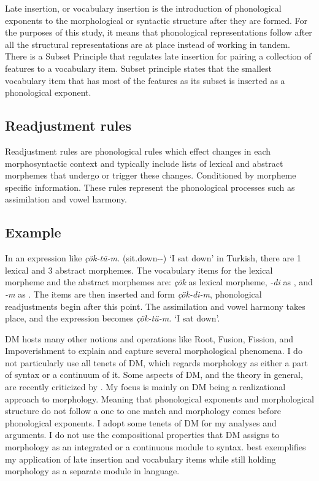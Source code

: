 Late insertion, or vocabulary insertion is the introduction of phonological exponents to the morphological or syntactic structure after they are formed. For the purposes of this study, it means that phonological representations follow after all the structural representations are at place instead of working in tandem. There is a Subset Principle \cite{halle2000distributed} that regulates late insertion for pairing a collection of features to a vocabulary item. Subset principle states that the smallest vocabulary item that has most of the features as its subset is inserted as a phonological exponent. 

\subsection{Readjustment rules}

Readjustment rules are phonological rules which effect changes in each morphosyntactic context and typically include lists of lexical and abstract morphemes that undergo or trigger these changes. Conditioned by morpheme specific information. These rules represent the phonological processes such as assimilation and vowel harmony.


\subsection{Example}

In an expression like \textit{çök-tü-m.} (sit.down-{\Pst}-{\Fsg}) `I sat down' in Turkish, there are 1 lexical and 3 abstract morphemes. The vocabulary items for the lexical morpheme and the abstract morphemes are: \textit{çök} as lexical morpheme, \textit{-di} as {\Pst}, and \textit{-m} as {\Fsg}. The items are then inserted and form \textit{çök-di-m}, phonological readjustments begin after this point. The assimilation and vowel harmony takes place, and the expression becomes \textit{çök-tü-m.} `I sat down'. 

DM hosts many other notions and operations like Root, Fusion, Fission, and Impoverishment \citep{halle2000distributed,bonet1991morphology, embick2015morpheme} to explain and capture several morphological phenomena. I do not particularly use all tenets of DM, which regards morphology as either a part of syntax or a continuum of it. Some aspects of DM, and the theory in general, are recently criticized by \cite{spencer2019manufacturing}. My focus is mainly on DM being a realizational approach to morphology. Meaning that phonological exponents and morphological structure do not follow a one to one match and morphology comes before phonological exponents. I adopt some tenets of DM for my analyses and arguments. I do not use the compositional properties that DM assigns to morphology as an integrated or a continuous module to syntax. \cite{ackema2007morphology} best exemplifies my application of late insertion and vocabulary items while still holding morphology as a separate module in language.